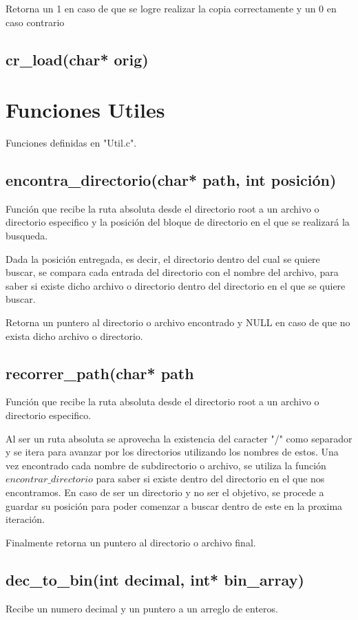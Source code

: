 \documentclass[12pt]{article}
\begin{document}
Retorna un 1 en caso de que se logre realizar la copia correctamente y un 0 en caso contrario
\subsection{cr\_load(char* orig)}

\section{Funciones Utiles}
Funciones definidas en "Util.c".

\subsection{encontra\_directorio(char* path, int posición)}
Función que recibe la ruta absoluta desde el directorio root a un archivo o directorio especifico y la posición del bloque de directorio en el que se realizará la busqueda. 

Dada la posición entregada, es decir, el directorio dentro del cual se quiere buscar, se compara cada entrada del directorio con el nombre del archivo, para saber si existe dicho archivo o directorio dentro del directorio en el que se quiere buscar. 

Retorna un puntero al directorio o archivo encontrado y NULL en caso de que no exista dicho archivo o directorio.

\subsection{recorrer\_path(char* path}
Función que recibe la ruta absoluta desde el directorio root a un archivo o directorio especifico.

Al ser un ruta absoluta se aprovecha la existencia del caracter "/" como separador y se itera para avanzar por los directorios utilizando los nombres de estos. Una vez encontrado cada nombre de subdirectorio o archivo, se utiliza la función $encontrar\_directorio$ para saber si existe dentro del directorio en el que nos encontramos. En caso de ser un directorio y no ser el objetivo, se procede a guardar su posición para poder comenzar a buscar dentro de este en la proxima iteración. 

Finalmente retorna un puntero al directorio o archivo final.

\subsection{dec\_to\_bin(int decimal, int* bin\_array)}
Recibe un numero decimal y un puntero a un arreglo de enteros.
\end{document}
